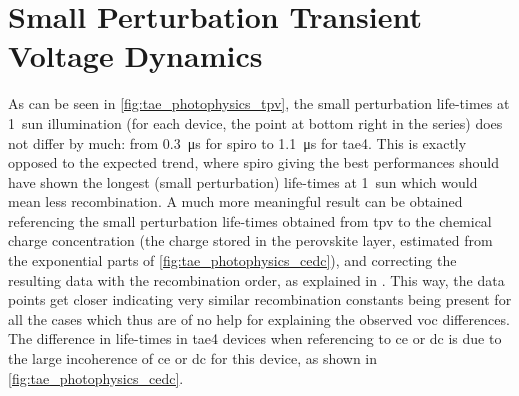 \section{Small Perturbation Transient Voltage Dynamics}


	As can be seen in \cref{fig:tae_photophysics_tpv}, the small perturbation life-times at \SI{1}{sun} illumination (for each device, the point at bottom right in the series) does not differ by much: from \SI{0.3}{\us} for \gls{spiro} to \SI{1.1}{\us} for \gls{tae4}.
	This is exactly opposed to the expected trend, where \gls{spiro} giving the best performances should have shown the longest (small perturbation) life-times at 1~sun which would mean less recombination.
	A much more meaningful result can be obtained referencing the small perturbation life-times obtained from \gls{tpv} to the chemical charge concentration (the charge stored in the perovskite layer, estimated from the exponential parts of \cref{fig:tae_photophysics_cedc}), and correcting the resulting data with the recombination order, as explained in .
	This way, the data points get closer indicating very similar recombination constants being present for all the cases which thus are of no help for explaining the observed \gls{voc} differences.
	The difference in life-times in \gls{tae4} devices when referencing to \gls{ce} or \gls{dc} is due to the large incoherence of \gls{ce} or \gls{dc} for this device, as shown in \cref{fig:tae_photophysics_cedc}.
	
